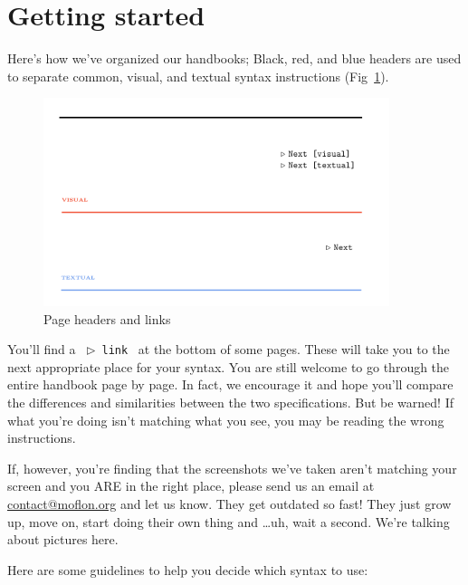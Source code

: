 \section{Getting started}
\genHeader 

Here's how we've organized our handbooks; Black, red, and blue headers are used to separate common, visual, and textual syntax
instructions (Fig~\ref{pageExamples}).

\begin{figure}[htbp] \centering
  \includegraphics[width=0.9\textwidth]{headers}
	\caption{Page headers and links}
	\label{pageExamples} 
\end{figure}

You'll find a \mbox{ $\triangleright$ {\texttt{link}} } at the bottom of some pages. These will take you to the next appropriate place for your syntax.
You are still welcome to go through the entire handbook page by page. In fact, we encourage it and hope you'll compare the differences and similarities
between the two specifications. But be warned! If what you're doing isn't matching what you see, you may be reading the wrong instructions.

If, however, you're finding that the screenshots we've taken aren't matching your screen and you ARE in the right place, please send us an email at
\href{mailto:contact@moflon.org}{contact@moflon.org} and let us know. They get outdated so fast! They just grow up, move on, start doing their own thing and
\ldots uh, wait a second. We're talking about pictures here.

Here are some guidelines to help you decide which syntax to use:

